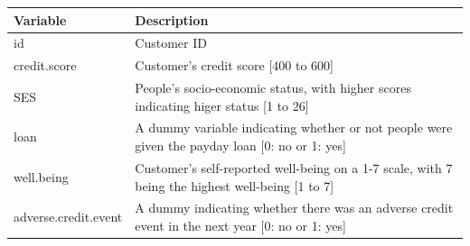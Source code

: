 \documentclass[]{article}
\begin{document}
\begin{longtable}[]{@{}ll@{}}
\toprule
\begin{minipage}[b]{0.08\columnwidth}\raggedright
Variable\strut
\end{minipage} & \begin{minipage}[b]{0.86\columnwidth}\raggedright
Description\strut
\end{minipage}\tabularnewline
\midrule
\endhead
\begin{minipage}[t]{0.08\columnwidth}\raggedright
id\strut
\end{minipage} & \begin{minipage}[t]{0.86\columnwidth}\raggedright
Customer ID\strut
\end{minipage}\tabularnewline
\begin{minipage}[t]{0.08\columnwidth}\raggedright
credit.score\strut
\end{minipage} & \begin{minipage}[t]{0.86\columnwidth}\raggedright
Customer's credit score {[}400 to 600{]}\strut
\end{minipage}\tabularnewline
\begin{minipage}[t]{0.08\columnwidth}\raggedright
SES\strut
\end{minipage} & \begin{minipage}[t]{0.86\columnwidth}\raggedright
People's socio-economic status, with higher scores indicating higer
status {[}1 to 26{]}\strut
\end{minipage}\tabularnewline
\begin{minipage}[t]{0.08\columnwidth}\raggedright
loan\strut
\end{minipage} & \begin{minipage}[t]{0.86\columnwidth}\raggedright
A dummy variable indicating whether or not people were given the payday
loan {[}0: no or 1: yes{]}\strut
\end{minipage}\tabularnewline
\begin{minipage}[t]{0.08\columnwidth}\raggedright
well.being\strut
\end{minipage} & \begin{minipage}[t]{0.86\columnwidth}\raggedright
Customer's self-reported well-being on a 1-7 scale, with 7 being the
highest well-being {[}1 to 7{]}\strut
\end{minipage}\tabularnewline
\begin{minipage}[t]{0.08\columnwidth}\raggedright
adverse.credit.event\strut
\end{minipage} & \begin{minipage}[t]{0.86\columnwidth}\raggedright
A dummy indicating whether there was an adverse credit event in the next
year {[}0: no or 1: yes{]}\strut
\end{minipage}\tabularnewline
\bottomrule
\end{longtable}
\end{document}
